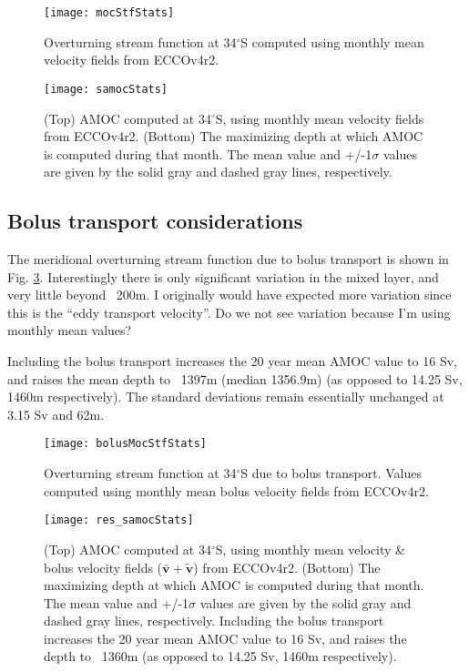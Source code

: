 \documentclass[a4paper,11pt]{article}
\newcommand{\degSym}{$^{\circ}$}
\begin{document}
   
   \begin{figure}
    \centering
    \texttt{[image: mocStfStats]}
    \caption{Overturning stream function at 34\degSym S computed using monthly mean velocity fields from ECCOv4r2.}
    \label{fig:mocStfStats}
   \end{figure}
   
   \begin{figure}
    \centering
    \texttt{[image: samocStats]}
    \caption{(Top) AMOC computed at 34\degSym S, using monthly mean velocity fields from ECCOv4r2. (Bottom) The maximizing depth at which AMOC is computed during that month. The mean value and +/-1$\sigma$ values are given by the solid gray and dashed gray lines, respectively.}
    \label{fig:samocStats}
   \end{figure}

   
   \subsection{Bolus transport considerations}
   \label{bolus}
   
   The meridional overturning stream function due to bolus transport is shown in Fig. \ref{fig:bolusMocStfStats}. Interestingly there is only significant variation in the mixed layer, and very little beyond ~200m. I originally would have expected more variation since this is the ``eddy transport velocity''. Do we not see variation because I'm using monthly mean values? 
   
   Including the bolus transport increases the 20 year mean AMOC value to 16 Sv, and raises the mean depth to ~1397m (median 1356.9m) (as opposed to 14.25 Sv, 1460m respectively). The standard deviations remain essentially unchanged at 3.15 Sv and 62m. 
   
   \begin{figure}
    \centering
    \texttt{[image: bolusMocStfStats]}
    \caption{Overturning stream function at 34\degSym S due to bolus transport. Values computed using monthly mean bolus velocity fields from ECCOv4r2.}
    \label{fig:bolusMocStfStats}
   \end{figure}
   
   \begin{figure}
    \centering
    \texttt{[image: res\_samocStats]}
    \caption{(Top) AMOC computed at 34\degSym S, using monthly mean velocity \& bolus velocity fields ($\bar{\mathbf{v}}+\tilde{\mathbf{v}}$) from ECCOv4r2. (Bottom) The maximizing depth at which AMOC is computed during that month. The mean value and +/-1$\sigma$ values are given by the solid gray and dashed gray lines, respectively. Including the bolus transport increases the 20 year mean AMOC value to 16 Sv, and raises the depth to ~1360m (as opposed to 14.25 Sv, 1460m respectively).}
    \label{fig:res_samocStats}
   \end{figure}
\end{document}
